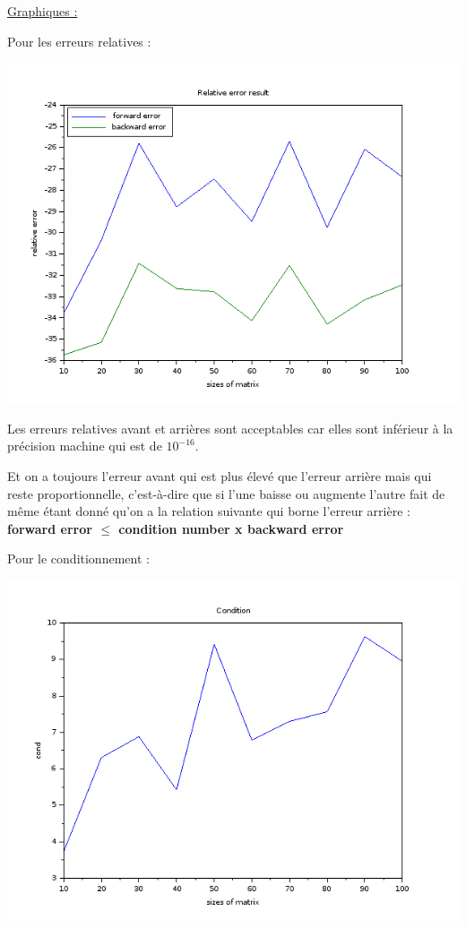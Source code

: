\documentclass{article}
\begin{document}
\underline{Graphiques :} \newline

Pour les erreurs relatives :

\includegraphics[scale=0.5]{img/gauss_error.png}

Les erreurs relatives avant et arrières sont acceptables car elles
sont inférieur à la précision machine qui est de $10^{-16}$. \newline

Et on a toujours l'erreur avant qui est plus élevé que l'erreur
arrière mais qui reste proportionnelle, c'est-à-dire que si l'une
baisse ou augmente l'autre fait de même étant donné qu'on a la
relation suivante qui borne l'erreur arrière : \newline
\textbf{forward error $\le$ condition number x backward
  error} \newline

Pour le conditionnement :

\includegraphics[scale=0.5]{img/gauss_cond.png}
\end{document}
